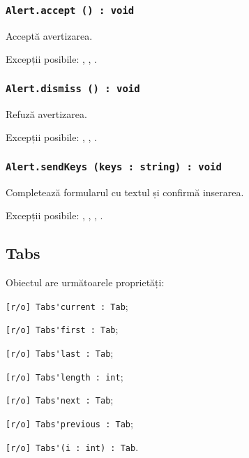 \subsubsection{\lstinline|Alert.accept () : void|}

Acceptă avertizarea.

Excepții posibile: , , .

\subsubsection{\lstinline|Alert.dismiss () : void|}

Refuză avertizarea.

Excepții posibile: , , .

\subsubsection{\lstinline|Alert.sendKeys (keys : string) : void|}

Completează formularul cu textul  și confirmă inserarea.

Excepții posibile: , , , .

\subsection{{\color{orange} Tabs}}

Obiectul \tabs{} are următoarele proprietăți:
\begin{icItems}
	\item \lstinline|[r/o] Tabs'current : Tab|;
	\item \lstinline|[r/o] Tabs'first : Tab|;
	\item \lstinline|[r/o] Tabs'last : Tab|;
	\item \lstinline|[r/o] Tabs'length : int|;
	\item \lstinline|[r/o] Tabs'next : Tab|;
	\item \lstinline|[r/o] Tabs'previous : Tab|;
	\item \lstinline|[r/o] Tabs'(i : int) : Tab|.
\end{icItems}


